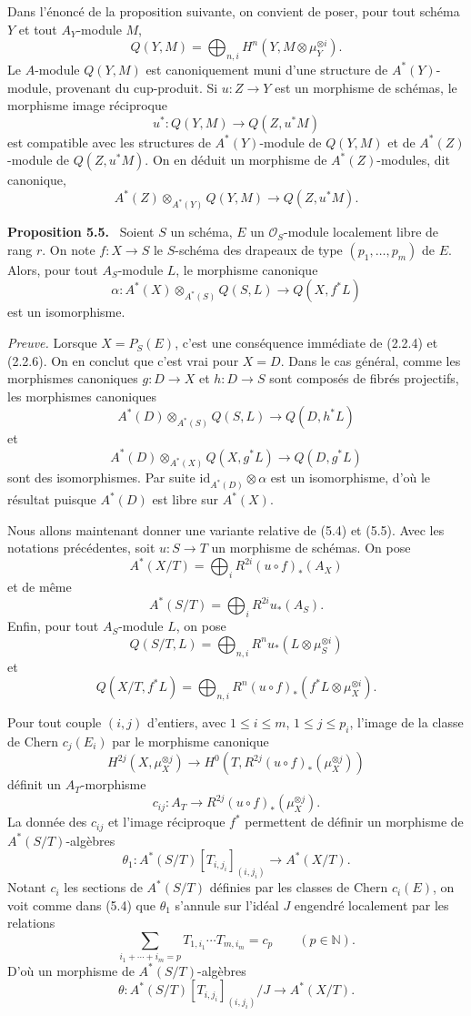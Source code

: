 \documentclass[11pt]{article}
\newenvironment{statement}[1]{\par\medskip\noindent\textbf{#1.}\ }{\par\medskip}
\begin{document}
Dans l'énoncé de la proposition suivante, on convient de poser, pour tout schéma $Y$ et tout $A_Y$-module $M$,
\[
Q(Y,M)=\bigoplus_{n,i}H^n(Y,M\otimes\mu_Y^{\otimes i}).
\]
Le $A$-module $Q(Y,M)$ est canoniquement muni d'une structure de $A^*(Y)$-module, provenant du cup-produit. Si $u:Z\to Y$ est un morphisme de schémas, le morphisme image réciproque
\[
u^*:Q(Y,M)\to Q(Z,u^*M)
\]
est compatible avec les structures de $A^*(Y)$-module de $Q(Y,M)$ et de $A^*(Z)$-module de $Q(Z,u^*M)$. On en déduit un morphisme de $A^*(Z)$-modules, dit canonique,
\[
A^*(Z)\otimes_{A^*(Y)}Q(Y,M)\to Q(Z,u^*M).
\]

\begin{statement}{Proposition 5.5}
Soient $S$ un schéma, $E$ un $\mathcal O_S$-module localement libre de rang $r$. On note $f:X\to S$ le $S$-schéma des drapeaux de type $(p_1,\ldots,p_m)$ de $E$. Alors, pour tout $A_S$-module $L$, le morphisme canonique
\[
\alpha:A^*(X)\otimes_{A^*(S)}Q(S,L)\to Q(X,f^*L)
\]
est un isomorphisme.
\end{statement}

\emph{Preuve.} Lorsque $X=P_S(E)$, c'est une conséquence immédiate de (2.2.4) et (2.2.6). On en conclut que c'est vrai pour $X=D$. Dans le cas général, comme les morphismes canoniques $g:D\to X$ et $h:D\to S$ sont composés de fibrés projectifs, les morphismes canoniques
\[
A^*(D)\otimes_{A^*(S)}Q(S,L)\to Q(D,h^*L)
\]
et
\[
A^*(D)\otimes_{A^*(X)}Q(X,g^*L)\to Q(D,g^*L)
\]
sont des isomorphismes. Par suite $\mathrm{id}_{A^*(D)}\otimes\alpha$ est un isomorphisme, d'où le résultat puisque $A^*(D)$ est libre sur $A^*(X)$.

Nous allons maintenant donner une variante relative de (5.4) et (5.5). Avec les notations précédentes, soit $u:S\to T$ un morphisme de schémas. On pose
\[
A^*(X/T)=\bigoplus_i R^{2i}(u\circ f)_*(A_X)
\]
et de même
\[
A^*(S/T)=\bigoplus_i R^{2i}u_*(A_S).
\]
Enfin, pour tout $A_S$-module $L$, on pose
\[
Q(S/T,L)=\bigoplus_{n,i}R^n u_*(L\otimes\mu_S^{\otimes i})
\]
et
\[
Q(X/T,f^*L)=\bigoplus_{n,i}R^n(u\circ f)_*(f^*L\otimes\mu_X^{\otimes i}).
\]

Pour tout couple $(i,j)$ d'entiers, avec $1\le i\le m$, $1\le j\le p_i$, l'image de la classe de Chern $c_j(E_i)$ par le morphisme canonique
\[
H^{2j}(X,\mu_X^{\otimes j})
\to H^0(T,R^{2j}(u\circ f)_*(\mu_X^{\otimes j}))
\]
définit un $A_T$-morphisme
\[
c_{ij}:A_T\to R^{2j}(u\circ f)_*(\mu_X^{\otimes j}).
\]
La donnée des $c_{ij}$ et l'image réciproque $f^*$ permettent de définir un morphisme de $A^*(S/T)$-algèbres
\[
\theta_1:A^*(S/T)[T_{i,j_i}]_{(i,j_i)}\to A^*(X/T).
\]
Notant $c_i$ les sections de $A^*(S/T)$ définies par les classes de Chern $c_i(E)$, on voit comme dans (5.4) que $\theta_1$ s'annule sur l'idéal $J$ engendré localement par les relations
\[
\sum_{i_1+\cdots+i_m=p}T_{1,i_1}\cdots T_{m,i_m}=c_p\qquad(p\in\mathbb N).
\]
D'où un morphisme de $A^*(S/T)$-algèbres
\[
\theta:A^*(S/T)[T_{i,j_i}]_{(i,j_i)}/J\to A^*(X/T).
\]
\end{document}
